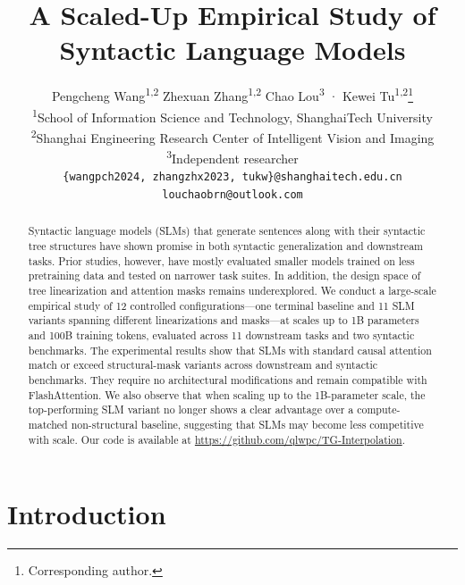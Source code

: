 \documentclass[11pt]{article}
\title{A Scaled-Up Empirical Study of Syntactic Language Models}
\author{
  Pengcheng Wang\textsuperscript{1,2} \quad
  Zhexuan Zhang\textsuperscript{1,2} \quad
  Chao Lou\textsuperscript{3} \quad·
  Kewei Tu\textsuperscript{1,2}\thanks{Corresponding author.}
  \\
  \textsuperscript{1}School of Information Science and Technology, ShanghaiTech University
  \\
  \textsuperscript{2}Shanghai Engineering Research Center of Intelligent Vision and Imaging
  \\
  \textsuperscript{3}Independent researcher
  \\
  \texttt{\{wangpch2024, zhangzhx2023, tukw\}@shanghaitech.edu.cn}
  \\
  \texttt{louchaobrn@outlook.com}
}
\begin{document}
\maketitle

\begin{abstract}
Syntactic language models (SLMs) that generate sentences along with their syntactic tree structures have shown promise in both syntactic generalization and downstream tasks. %
Prior studies, however, have mostly evaluated smaller models trained on less pretraining data and tested on narrower task suites. In addition, the design space of tree linearization and attention masks remains underexplored. 
We conduct a large-scale empirical study of 12 controlled configurations---one terminal baseline and 11 SLM variants spanning different linearizations and masks---at scales up to 1B parameters and 100B training tokens, evaluated across 11 downstream tasks and two syntactic benchmarks.
The experimental results show that SLMs with standard causal attention match or exceed structural-mask variants across downstream and syntactic benchmarks. They require no architectural modifications and remain compatible with FlashAttention. 
We also observe that when scaling up to the 1B-parameter scale, the top-performing SLM variant no longer shows a clear advantage over a compute-matched non-structural baseline, suggesting that SLMs may become less competitive with scale. Our code is available at \url{https://github.com/qlwpc/TG-Interpolation}.
\end{abstract}

\section{Introduction}
\end{document}

